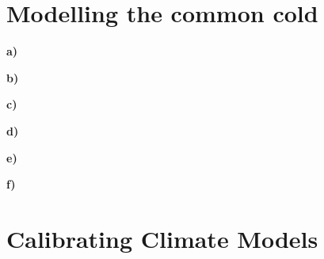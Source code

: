 \documentclass[11pt, a4paper, english]{NTNUoving}
\begin{document}
\section*{Modelling the common cold}
\textbf{a)}

\textbf{b)}

\textbf{c)}

\textbf{d)}

\textbf{e)}

\textbf{f)}



\section*{Calibrating Climate Models}
\end{document}
